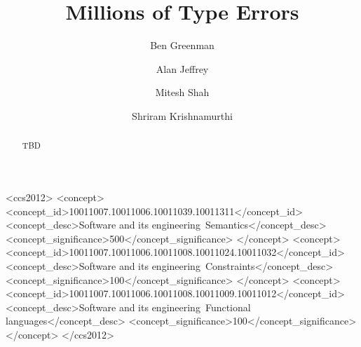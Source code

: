 \documentclass[acmsmall,review,anonymous]{acmart}
\begin{document}
\title{Millions of Type Errors}

\author{Ben Greenman}

\author{Alan Jeffrey}
\email{}

\author{Mitesh Shah}
\email{}

\author{Shriram Krishnamurthi}


\begin{abstract}
  TBD
\end{abstract}



\begin{CCSXML}
<ccs2012>
<concept>
<concept_id>10011007.10011006.10011039.10011311</concept_id>
<concept_desc>Software and its engineering~Semantics</concept_desc>
<concept_significance>500</concept_significance>
</concept>
<concept>
<concept_id>10011007.10011006.10011008.10011024.10011032</concept_id>
<concept_desc>Software and its engineering~Constraints</concept_desc>
<concept_significance>100</concept_significance>
</concept>
<concept>
<concept_id>10011007.10011006.10011008.10011009.10011012</concept_id>
<concept_desc>Software and its engineering~Functional languages</concept_desc>
<concept_significance>100</concept_significance>
</concept>
</ccs2012>
\end{CCSXML}



\maketitle
\end{document}
